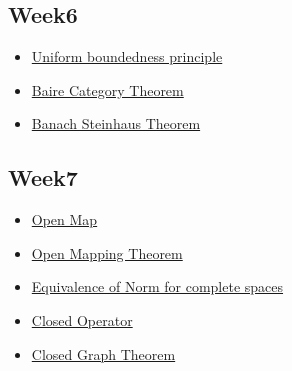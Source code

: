 \subsection{Week6}
\begin{itemize}
	\item \hyperref[UBP]{Uniform boundedness principle}
	\item \hyperref[BCT]{Baire Category Theorem}
	\item \hyperref[Banach Steinhaus]{Banach Steinhaus Theorem}
\end{itemize}

\subsection{Week7}
\begin{itemize}
	\item \hyperref[open map]{Open Map}
	\item \hyperref[OMT]{Open Mapping Theorem}
	\item \hyperref[Equinorm]{Equivalence of Norm for complete spaces}
	\item \hyperref[Closed Operator]{Closed Operator}
	\item \hyperref[CGT]{Closed Graph Theorem}
\end{itemize}
\begin{comment}
	



\subsection{Week3}
\begin{itemize}
	\item \hyperref[]{}
	\item \hyperref[]{}
	\item \hyperref[]{}
	\item \hyperref[]{}
	\item \hyperref[]{}
	\item \hyperref[]{}
	\item \hyperref[]{}
	\item \hyperref[]{}
\end{itemize}
\end{comment}
